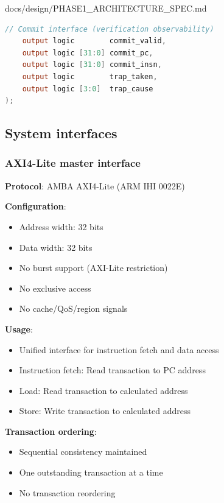 \begin{relocated}{docs/design/PHASE1_ARCHITECTURE_SPEC.md}
\begin{lstlisting}[language=Verilog]
    // Commit interface (verification observability)
    output logic        commit_valid,
    output logic [31:0] commit_pc,
    output logic [31:0] commit_insn,
    output logic        trap_taken,
    output logic [3:0]  trap_cause
);
\end{lstlisting}

\subsection{System interfaces}\label{ds:ch:phase1-architecture:system-interfaces}

\subsubsection{AXI4-Lite master interface}\label{ds:ch:phase1-architecture:axi4-lite-master-interface}

\textbf{Protocol}: AMBA AXI4-Lite (ARM IHI 0022E)

\textbf{Configuration}:

\begin{itemize}
\tightlist
\item
  Address width: 32 bits
\item
  Data width: 32 bits
\item
  No burst support (AXI-Lite restriction)
\item
  No exclusive access
\item
  No cache/\allowbreak{}QoS/\allowbreak{}region signals
\end{itemize}

\textbf{Usage}:

\begin{itemize}
\tightlist
\item
  Unified interface for instruction fetch and data access
\item
  Instruction fetch: Read transaction to PC address
\item
  Load: Read transaction to calculated address
\item
  Store: Write transaction to calculated address
\end{itemize}

\textbf{Transaction ordering}:

\begin{itemize}
\tightlist
\item
  Sequential consistency maintained
\item
  One outstanding transaction at a time
\item
  No transaction reordering
\end{itemize}


\end{relocated}
